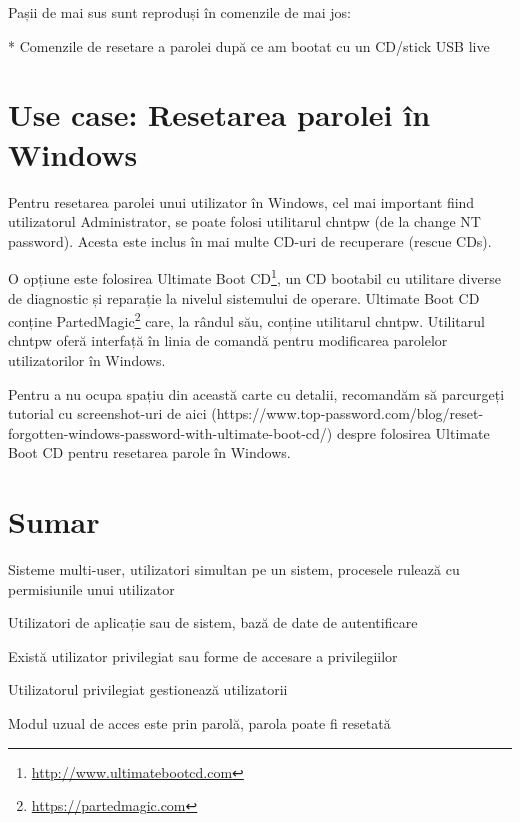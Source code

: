 Pașii de mai sus sunt reproduși în comenzile de mai jos:

* Comenzile de resetare a parolei după ce am bootat cu un CD/stick USB live

\section{Use case: Resetarea parolei în Windows}
\label{sec:users-pass-restore-window}

Pentru resetarea parolei unui utilizator în Windows, cel mai important fiind
utilizatorul Administrator, se poate folosi utilitarul chntpw (de la change NT
password). Acesta este inclus în mai multe CD-uri de recuperare (rescue CDs).

O opțiune este folosirea Ultimate Boot
CD\footnote{\url{http://www.ultimatebootcd.com}}, un CD bootabil cu utilitare
diverse de diagnostic și reparație la nivelul sistemului de operare. Ultimate
Boot CD conține PartedMagic\footnote{\url{https://partedmagic.com}} care, la
rândul său, conține utilitarul chntpw. Utilitarul chntpw oferă interfață în
linia de comandă pentru modificarea parolelor utilizatorilor în Windows.

Pentru a nu ocupa spațiu din această carte cu detalii, recomandăm să parcurgeți
tutorial cu screenshot-uri de aici
(https://www.top-password.com/blog/reset-forgotten-windows-password-with-ultimate-boot-cd/)
despre folosirea Ultimate Boot CD pentru resetarea parole în Windows.

\section{Sumar}
\label{sec:users-sumar}

Sisteme multi-user, utilizatori simultan pe un sistem, procesele rulează cu
permisiunile unui utilizator

Utilizatori de aplicație sau de sistem, bază de date de autentificare

Există utilizator privilegiat sau forme de accesare a privilegiilor

Utilizatorul privilegiat gestionează utilizatorii

Modul uzual de acces este prin parolă, parola poate fi resetată

